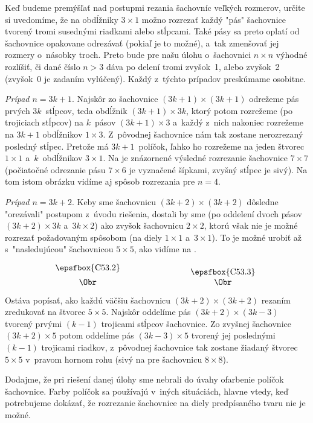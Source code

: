 {%
Keď budeme premýšľať nad postupmi rezania šachovníc
veľkých rozmerov, určite si uvedomíme, že na obdĺžniky
$3\times1$ možno rozrezať každý "pás" šachovnice tvorený tromi
susednými riadkami alebo stĺpcami. Také pásy sa preto oplatí od
šachovnice opakovane odrezávať (pokiaľ je to možné), a~tak
zmenšovať jej rozmery o~násobky troch. Preto bude pre našu úlohu
o~šachovnici $n\times n$ výhodné rozlíšiť, či dané číslo $n>3$ dáva
po delení tromi zvyšok~1, alebo zvyšok~2 (zvyšok~0 je zadaním
vylúčený). Každý z~týchto prípadov preskúmame osobitne.

\smallskip
{\it Prípad $n=3k+1$}. Najskôr zo šachovnice $(3k+1)\times(3k+1)$
odrežeme pás prvých $3k$~stĺpcov, teda obdĺžnik $(3k+1)\times3k$,
ktorý potom rozrežeme (po trojiciach stĺpcov) na $k$~pásov
$(3k+1)\times3$ a~každý z~nich nakoniec rozrežeme na $3k+1$
obdĺžnikov $1\times3$. Z~pôvodnej šachovnice nám tak zostane nerozrezaný
posledný stĺpec. Pretože má $3k+1$~políčok, ľahko ho rozrežeme na
jeden štvorec $1\times1$ a~$k$~obdĺžnikov $3\times1$. Na \obr{} je
znázornené výsledné rozrezanie šachovnice $7\times 7$ (počiatočné
odrezanie pásu $7\times6$ je vyznačené šípkami, zvyšný stĺpec je
sivý). Na tom istom obrázku vidíme aj spôsob rozrezania pre $n=4$.
%

\smallskip
{\it Prípad $n=3k+2$}. Keby sme šachovnicu $(3k+2)\times(3k+2)$
dôsledne "orezávali" postupom z~úvodu riešenia, dostali by sme (po
oddelení dvoch pásov $(3k+2)\times3k$ a~$3k\times2$) ako zvyšok
šachovnicu $2\times2$, ktorú však nie je možné rozrezať požadovaným
spôsobom (na diely $1\times1$ a~$3\times1$). To je možné urobiť až
s~"nasledujúcou" šachovnicou $5\times5$, ako vidíme na \obr.

$$
\vbox{\halign{# \qquad\qquad&\qquad\qquad # \cr
\hfil\lower-.173cm\hbox{\epsfbox{C53.2}}\hfil  & \hfil\hbox{\epsfbox{C53.3}}\hfil \cr 
\hfil\Obr\hfil  & \hfil\Obr\hfil \cr}}
$$

Ostáva popísať, ako každú väčšiu šachovnicu $(3k+2)\times(3k+2)$
rezaním zredukovať na štvorec $5\times5$.
Najskôr oddelíme pás $(3k+2)\times(3k-3)$ tvorený prvými $(k-1)$
trojicami stĺpcov šachovnice. Zo zvyšnej šachovnice $(3k+2)\times5$
potom oddelíme pás $(3k-3)\times5$ tvorený jej poslednými $(k-1)$
trojicami riadkov, z~pôvodnej šachovnice tak zostane žiadaný
štvorec $5\times5$ v~pravom hornom rohu
(sivý na \obr{} pre šachovnicu $8\times8$).

\smallskip
Dodajme, že pri riešení danej úlohy sme nebrali do úvahy ofarbenie
políčok šachovnice. Farby políčok sa používajú v~iných situáciách,
hlavne vtedy, keď potrebujeme dokázať, že rozrezanie šachovnice
na diely predpísaného tvaru nie je možné.}

